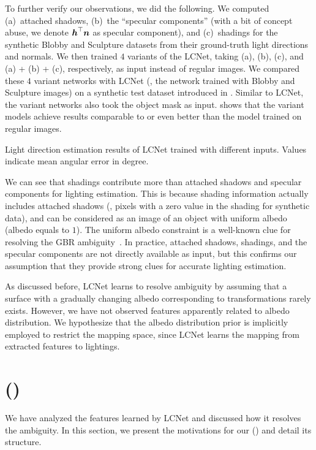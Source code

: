 To further verify our observations, we did the following. We computed (a)~attached shadows, (b)~the ``specular components'' (with a bit of concept abuse, we denote $\boldsymbol{h}^\top\boldsymbol{n}$ as specular component), and (c)~shadings for the synthetic Blobby and Sculpture datasets from their ground-truth light directions and normals.
We then trained $4$ variants of the LCNet, taking (a), (b), (c), and (a) + (b) + (c), respectively, as input instead of regular images.
We compared these $4$ variant networks with LCNet (\ie, the network trained with Blobby and Sculpture images) on a synthetic test dataset introduced in . Similar to LCNet, the variant networks also took the object mask as input.
 shows that the variant models achieve results comparable to or even better than the model trained on regular images. 

\begin{table}[t] \centering
    \caption[Results of LCNet trained with different inputs]{Light direction estimation results of LCNet trained with different inputs. Values indicate mean angular error in degree.} \label{tab:proxy}
    
\end{table}

We can see that shadings contribute more than attached shadows and specular components for lighting estimation. 
This is because shading information actually includes attached shadows (\ie, pixels with a zero value in the shading for synthetic data), and can be considered as an image of an object with uniform albedo (albedo equals to $1$). The uniform albedo constraint is a well-known clue for resolving the GBR ambiguity~\cite{belhumeur1999bas,papad14closed}.
In practice, attached shadows, shadings, and the specular components are not directly available as input, but this confirms our assumption that they provide strong clues for accurate lighting estimation.

As discussed before, LCNet learns to resolve ambiguity by assuming that a surface with a gradually changing albedo corresponding to \gbr transformations rarely exists. 
However, we have not observed features apparently related to albedo distribution. We hypothesize that the albedo distribution prior is implicitly employed to restrict the mapping space, since \mbox{LCNet} learns the mapping from extracted features to lightings.

\section{\GCNetname (\gcnetacronym)}
We have analyzed the features learned by LCNet and discussed how it resolves the ambiguity. In this section, we present the motivations for our \gcnetname (\gcnetacronym) and detail its structure.

